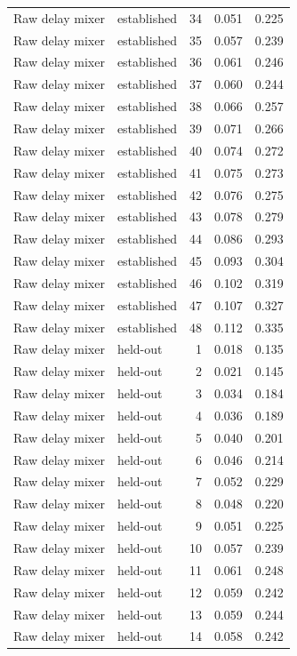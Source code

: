 \begin{tabular}{llrrr}
Raw delay mixer & established & 34 & 0.051 & 0.225 \\
Raw delay mixer & established & 35 & 0.057 & 0.239 \\
Raw delay mixer & established & 36 & 0.061 & 0.246 \\
Raw delay mixer & established & 37 & 0.060 & 0.244 \\
Raw delay mixer & established & 38 & 0.066 & 0.257 \\
Raw delay mixer & established & 39 & 0.071 & 0.266 \\
Raw delay mixer & established & 40 & 0.074 & 0.272 \\
Raw delay mixer & established & 41 & 0.075 & 0.273 \\
Raw delay mixer & established & 42 & 0.076 & 0.275 \\
Raw delay mixer & established & 43 & 0.078 & 0.279 \\
Raw delay mixer & established & 44 & 0.086 & 0.293 \\
Raw delay mixer & established & 45 & 0.093 & 0.304 \\
Raw delay mixer & established & 46 & 0.102 & 0.319 \\
Raw delay mixer & established & 47 & 0.107 & 0.327 \\
Raw delay mixer & established & 48 & 0.112 & 0.335 \\
Raw delay mixer & held-out & 1 & 0.018 & 0.135 \\
Raw delay mixer & held-out & 2 & 0.021 & 0.145 \\
Raw delay mixer & held-out & 3 & 0.034 & 0.184 \\
Raw delay mixer & held-out & 4 & 0.036 & 0.189 \\
Raw delay mixer & held-out & 5 & 0.040 & 0.201 \\
Raw delay mixer & held-out & 6 & 0.046 & 0.214 \\
Raw delay mixer & held-out & 7 & 0.052 & 0.229 \\
Raw delay mixer & held-out & 8 & 0.048 & 0.220 \\
Raw delay mixer & held-out & 9 & 0.051 & 0.225 \\
Raw delay mixer & held-out & 10 & 0.057 & 0.239 \\
Raw delay mixer & held-out & 11 & 0.061 & 0.248 \\
Raw delay mixer & held-out & 12 & 0.059 & 0.242 \\
Raw delay mixer & held-out & 13 & 0.059 & 0.244 \\
Raw delay mixer & held-out & 14 & 0.058 & 0.242 \\

\end{tabular}
